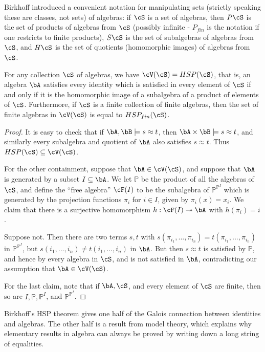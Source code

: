 Birkhoff \cite{birkhoff} introduced a convenient notation for manipulating sets (strictly speaking these are classes, not sets) of algebras: if $\cS$ is a set of algebras, then $P\cS$ is the set of products of algebras from $\cS$ (possibly infinite - $P_{fin}$ is the notation if one restricts to finite products), $S\cS$ is the set of subalgebras of algebras from $\cS$, and $H\cS$ is the set of quotients (homomorphic images) of algebras from $\cS$.

\begin{thm} For any collection $\cS$ of algebras, we have $\cV(\cS) = HSP(\cS)$, that is, an algebra $\bA$ satisfies every identity which is satisfied in every element of $\cS$ if and only if it is the homomorphic image of a subalgebra of a product of elements of $\cS$. Furthermore, if $\cS$ is a finite collection of finite algebras, then the set of finite algebras in $\cV(\cS)$ is equal to $HSP_{fin}(\cS)$.
\end{thm}
\begin{proof} It is easy to check that if $\bA, \bB \models s \approx t$, then $\bA \times \bB \models s \approx t$, and similarly every subalgebra and quotient of $\bA$ also satisfies $s \approx t$. Thus $HSP(\cS) \subseteq \cV(\cS)$.

For the other containment, suppose that $\bA \in \cV(\cS)$, and suppose that $\bA$ is generated by a subset $I \subseteq \bA$. We let $\mathbb{P}$ be the product of all the algebras of $\cS$, and define the ``free algebra'' $\cF(I)$ to be the subalgebra of $\mathbb{P}^{\mathbb{P}^I}$ which is generated by the projection functions $\pi_i$ for $i \in I$, given by $\pi_i(x) = x_i$. We claim that there is a surjective homomorphism $h : \cF(I) \twoheadrightarrow \bA$ with $h(\pi_i) = i$.

Suppose not. Then there are two terms $s,t$ with $s(\pi_{i_1}, ..., \pi_{i_n}) = t(\pi_{i_1}, ..., \pi_{i_n})$ in $\mathbb{P}^{\mathbb{P}^I}$, but $s(i_1, ..., i_n) \ne t(i_1, ..., i_n)$ in $\bA$. But then $s \approx t$ is satisfied by $\mathbb{P}$, and hence by every algebra in $\cS$, and is not satisfied in $\bA$, contradicting our assumption that $\bA \in \cV(\cS)$.

For the last claim, note that if $\bA, \cS$, and every element of $\cS$ are finite, then so are $I, \mathbb{P}, \mathbb{P}^I$, and $\mathbb{P}^{\mathbb{P}^I}$.
\end{proof}

Birkhoff's HSP theorem gives one half of the Galois connection between identities and algebras. The other half is a result from model theory, which explains why elementary results in algebra can always be proved by writing down a long string of equalities.

